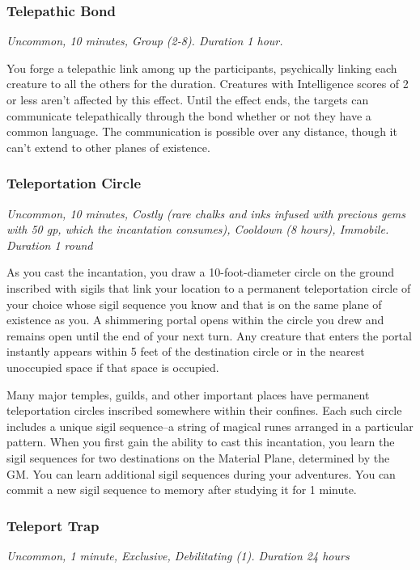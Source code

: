 \subsubsection{Telepathic Bond}
\textit{Uncommon, 10 minutes, Group (2-8). Duration 1 hour.}

You forge a telepathic link among up the participants, psychically linking each creature to all the others for the duration. Creatures with Intelligence scores of 2 or less aren't affected by this effect. Until the effect ends, the targets can communicate telepathically through the bond whether or not they have a common language. The communication is possible over any distance, though it can't extend to other planes of existence.

\subsubsection{Teleportation Circle }
\textit{Uncommon, 10 minutes, Costly (rare chalks and inks infused with precious gems with 50 gp, which the incantation consumes), Cooldown (8 hours), Immobile. Duration 1 round}

As you cast the incantation, you draw a 10-foot-diameter circle on the ground inscribed with sigils that link your location to a permanent teleportation circle of your choice whose sigil sequence you know and that is on the same plane of existence as you. A shimmering portal opens within the circle you drew and remains open until the end of your next turn. Any creature that enters the portal instantly appears within 5 feet of the destination circle or in the nearest unoccupied space if that space is occupied.

Many major temples, guilds, and other important places have permanent teleportation circles inscribed somewhere within their confines. Each such circle includes a unique sigil sequence--a string of magical runes arranged in a particular pattern. When you first gain the ability to cast this incantation, you learn the sigil sequences for two destinations on the Material Plane, determined by the GM. You can learn additional sigil sequences during your adventures. You can commit a new sigil sequence to memory after studying it for 1 minute.

\subsubsection{Teleport Trap}
\textit{Uncommon, 1 minute, Exclusive, Debilitating (1). Duration 24 hours}

